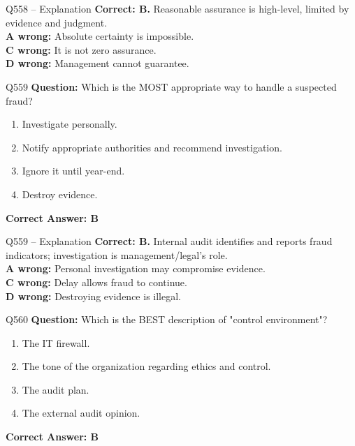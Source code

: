 \documentclass[aspectratio=169,10pt]{beamer}
\begin{document}
	\begin{frame}[t]{Q558 -- Explanation}
		\small
		\textbf{Correct: B.} Reasonable assurance is high-level, limited by evidence and judgment. \\[4pt]
		\textbf{A wrong:} Absolute certainty is impossible. \\[2pt]
		\textbf{C wrong:} It is not zero assurance. \\[2pt]
		\textbf{D wrong:} Management cannot guarantee.
	\end{frame}
	
	\begin{frame}[t]{Q559}
		\small
		\textbf{Question:} Which is the MOST appropriate way to handle a suspected fraud?
		\begin{enumerate}[label=\Alph*.,itemsep=1pt,topsep=2pt]
			\item Investigate personally.
			\item Notify appropriate authorities and recommend investigation.
			\item Ignore it until year-end.
			\item Destroy evidence.
		\end{enumerate}
		\vspace{4pt}
		\textbf{Correct Answer: B}
	\end{frame}
	
	\begin{frame}[t]{Q559 -- Explanation}
		\small
		\textbf{Correct: B.} Internal audit identifies and reports fraud indicators; investigation is management/legal's role. \\[4pt]
		\textbf{A wrong:} Personal investigation may compromise evidence. \\[2pt]
		\textbf{C wrong:} Delay allows fraud to continue. \\[2pt]
		\textbf{D wrong:} Destroying evidence is illegal.
	\end{frame}
	
	\begin{frame}[t]{Q560}
		\small
		\textbf{Question:} Which is the BEST description of "control environment"?
		\begin{enumerate}[label=\Alph*.,itemsep=1pt,topsep=2pt]
			\item The IT firewall.
			\item The tone of the organization regarding ethics and control.
			\item The audit plan.
			\item The external audit opinion.
		\end{enumerate}
		\vspace{4pt}
		\textbf{Correct Answer: B}
	\end{frame}
	
\end{document}
